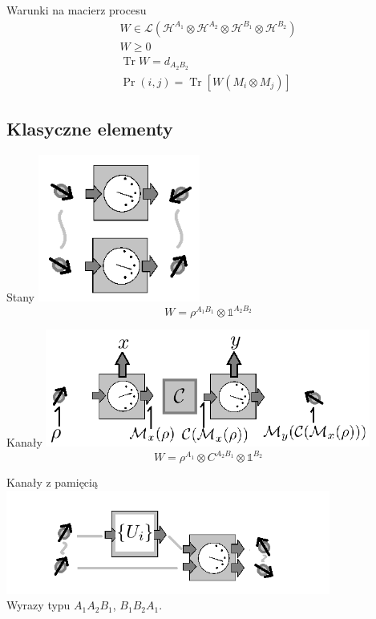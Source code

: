\documentclass{beamer}
\newcommand{\Mats}[1]{\mathcal{L}(#1)}
\newcommand{\Hx}[1]{\mathcal{H}^{#1}}
\newcommand{\I}{\mathbb{1}}
\DeclareMathOperator{\Trs}{Tr}
\begin{document}
\begin{frame}{Warunki na macierz procesu}
\centering
\begin{gather}
W  \in \Mats{\Hx{A_1} \otimes \Hx{A_2} \otimes \Hx{B_1} \otimes \Hx{B_2}}\\
W \geq 0 \\
\Trs W=d_{A_2B_2}\\
\Pr(i,j) = \Trs\left[ W \left( M_i \otimes M_j\right)\right]
\end{gather}
\end{frame}

\subsection{Klasyczne elementy}
\begin{frame}{Stany}
\centering
\includegraphics[width=0.4\textwidth]{obrazki/states_new}\\
\begin{equation}
W = \rho^{A_1B_1} \otimes \I^{A_2B_2}
\end{equation}
\end{frame}

\begin{frame}{Kanały}
\centering
\includegraphics[width=0.8\textwidth]{obrazki/channel_new}\\
\begin{equation}
W = \rho^{A_1} \otimes C^{A_2B_1} \otimes \I^{B_2}
\end{equation}
\end{frame}

\begin{frame}{Kanały z pamięcią}
\centering
\includegraphics[width=0.8\textwidth]{obrazki/memory_new}\\
Wyrazy typu $A_1A_2B_1$, $B_1B_2A_1$.
\end{frame}
\end{document}
